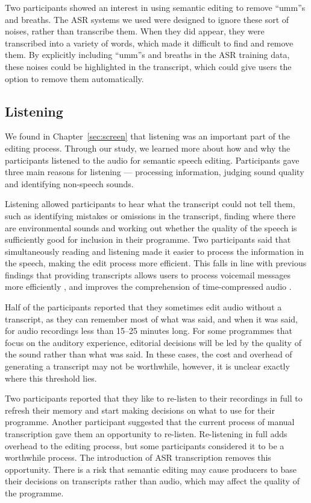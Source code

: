 Two participants showed an interest in using semantic editing to remove ``umm''s and breaths. The ASR systems we used
were designed to ignore these sort of noises, rather than transcribe them. When they did appear, they were transcribed
into a variety of words, which made it difficult to find and remove them. By explicitly including ``umm''s and breaths
in the ASR training data, these noises could be highlighted in the transcript, which could give users the option to
remove them automatically.


\subsection{Listening}

We found in Chapter~\ref{sec:screen} that listening was an important part of the editing process. Through our study, we
learned more about how and why the participants listened to the audio for semantic speech editing.  Participants gave
three main reasons for listening --- processing information, judging sound quality and identifying non-speech sounds.

Listening allowed participants to hear what the transcript could not tell them, such as identifying mistakes or
omissions in the transcript, finding where there are environmental sounds and working out whether the quality of the
speech is sufficiently good for inclusion in their programme.  Two participants said that simultaneously reading and
listening made it easier to process the information in the speech, making the edit process more efficient. This falls
in line with previous findings that providing transcripts allows users to process voicemail messages more efficiently
\citep{Whittaker2002}, and improves the comprehension of time-compressed audio \citep{Vemuri2004}.

Half of the participants reported that they sometimes edit audio without a transcript, as they can remember most of
what was said, and when it was said, for audio recordings less than 15--25 minutes long.  For some programmes that
focus on the auditory experience, editorial decisions will be led by the quality of the sound rather than what was
said. In these cases, the cost and overhead of generating a transcript may not be worthwhile, however, it is unclear
exactly where this threshold lies.

Two participants reported that they like to re-listen to their recordings in full to refresh their memory and start
making decisions on what to use for their programme.  Another participant suggested that the current process of manual
transcription gave them an opportunity to re-listen.  Re-listening in full adds overhead to the editing process, but
some participants considered it to be a worthwhile process.  The introduction of ASR transcription removes this
opportunity. There is a risk that semantic editing may cause producers to base their decisions on transcripts rather
than audio, which may affect the quality of the programme.

